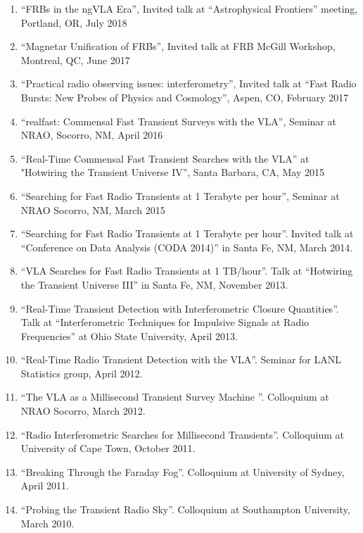 \documentclass[11pt]{article}
\begin{document}
\begin{enumerate}

    \item ``FRBs in the ngVLA Era'', Invited talk at ``Astrophysical Frontiers'' meeting, Portland, OR, July 2018

    \item ``Magnetar Unification of FRBs'', Invited talk at FRB McGill Workshop, Montreal, QC, June 2017

    \item ``Practical radio observing issues: interferometry'', Invited talk at ``Fast Radio Bursts: New Probes of Physics and Cosmology'', Aspen, CO, February 2017

    \item ``realfast: Commensal Fast Transient Surveys with the VLA'', Seminar at NRAO, Socorro, NM, April 2016

    \item ``Real-Time Commensal Fast Transient Searches with the VLA'' at "Hotwiring the Transient Universe IV'', Santa Barbara, CA, May 2015

    \item ``Searching for Fast Radio Transients at 1 Terabyte per hour'', Seminar at NRAO Socorro, NM, March 2015

    \item ``Searching for Fast Radio Transients at 1 Terabyte per hour''. Invited talk at ``Conference on Data Analysis (CODA 2014)'' in Santa Fe, NM, March 2014.

    \item ``VLA Searches for Fast Radio Transients at 1 TB/hour''. Talk at ``Hotwiring the Transient Universe III'' in Santa Fe, NM, November 2013.

    \item ``Real-Time Transient Detection with Interferometric Closure Quantities''. Talk at ``Interferometric Techniques for Impulsive Signals at Radio Frequencies'' at Ohio State University, April 2013.

    \item ``Real-Time Radio Transient Detection with the VLA''. Seminar for LANL Statistics group, April 2012.

    \item ``The VLA as a Millisecond Transient Survey Machine ''. Colloquium at NRAO Socorro, March 2012.

    \item ``Radio Interferometric Searches for Millisecond Transients''. Colloquium at University of Cape Town, October 2011.

    \item ``Breaking Through the Faraday Fog''. Colloquium at University of Sydney, April 2011.

    \item ``Probing the Transient Radio Sky''. Colloquium at Southampton University, March 2010.
\end{enumerate}
\end{document}
